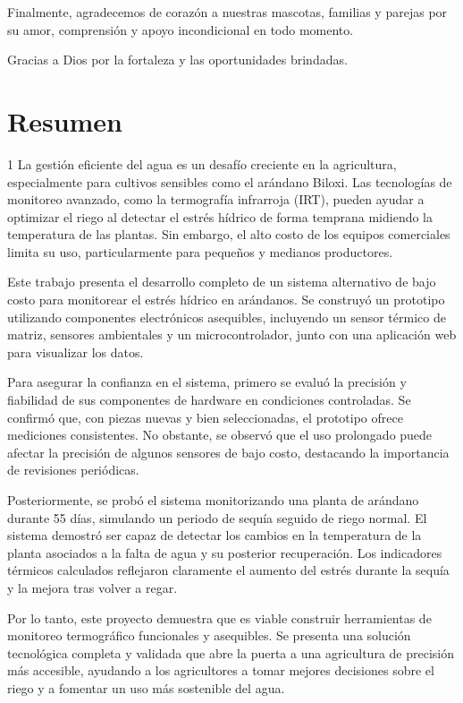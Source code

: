 \documentclass[12pt,openright,oneside]{book}
\begin{document}
Finalmente, agradecemos de corazón a nuestras mascotas, familias y parejas por su amor, comprensión y apoyo incondicional en todo momento. 

Gracias a Dios por la fortaleza y las oportunidades brindadas.


\chapter*{Resumen}

\begin{spacing}{1}
La gestión eficiente del agua es un desafío creciente en la agricultura, especialmente para cultivos sensibles como el arándano Biloxi. Las tecnologías de monitoreo avanzado, como la termografía infrarroja (IRT), pueden ayudar a optimizar el riego al detectar el estrés hídrico de forma temprana midiendo la temperatura de las plantas. Sin embargo, el alto costo de los equipos comerciales limita su uso, particularmente para pequeños y medianos productores.

Este trabajo presenta el desarrollo completo de un sistema alternativo de bajo costo para monitorear el estrés hídrico en arándanos. Se construyó un prototipo utilizando componentes electrónicos asequibles, incluyendo un sensor térmico de matriz, sensores ambientales y un microcontrolador, junto con una aplicación web para visualizar los datos.

Para asegurar la confianza en el sistema, primero se evaluó la precisión y fiabilidad de sus componentes de hardware en condiciones controladas. Se confirmó que, con piezas nuevas y bien seleccionadas, el prototipo ofrece mediciones consistentes. No obstante, se observó que el uso prolongado puede afectar la precisión de algunos sensores de bajo costo, destacando la importancia de revisiones periódicas.

Posteriormente, se probó el sistema monitorizando una planta de arándano durante 55 días, simulando un periodo de sequía seguido de riego normal. El sistema demostró ser capaz de detectar los cambios en la temperatura de la planta asociados a la falta de agua y su posterior recuperación. Los indicadores térmicos calculados reflejaron claramente el aumento del estrés durante la sequía y la mejora tras volver a regar.

Por lo tanto, este proyecto demuestra que es viable construir herramientas de monitoreo termográfico funcionales y asequibles. Se presenta una solución tecnológica completa y validada que abre la puerta a una agricultura de precisión más accesible, ayudando a los agricultores a tomar mejores decisiones sobre el riego y a fomentar un uso más sostenible del agua.
\end{spacing}
\end{document}
